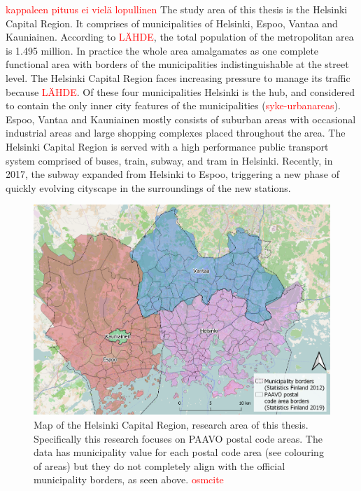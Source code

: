 \textcolor{red}{kappaleen pituus ei vielä lopullinen} The study area of this thesis is the Helsinki Capital Region. It comprises of municipalities of Helsinki, Espoo, Vantaa and Kauniainen. According to \textcolor{red}{LÄHDE}, the total population of the metropolitan area is 1.495 million. In practice the whole area amalgamates as one complete functional area with borders of the municipalities indistinguishable at the street level. The Helsinki Capital Region faces increasing pressure to manage its traffic because \textcolor{red}{LÄHDE}. Of these four municipalities Helsinki is the hub, and considered to contain the only inner city features of the municipalities (\textcolor{red}{syke-urbanareas}). Espoo, Vantaa and Kauniainen mostly consists of suburban areas with occasional industrial areas and large shopping complexes placed throughout the area. The Helsinki Capital Region is served with a high performance public transport system comprised of buses, train, subway, and tram in Helsinki. Recently, in 2017, the subway expanded from Helsinki to Espoo, triggering a new phase of quickly evolving cityscape in the surroundings of the new stations.

\begin{figure}[H]%
    \includegraphics[width=\textwidth]{images/thesis_resarea.png}
    \caption[Research area map]{Map of the Helsinki Capital Region, research area of this thesis. Specifically this research focuses on PAAVO postal code areas. The data has municipality value for each postal code area (see colouring of areas) but they do not completely align with the official municipality borders, as seen above. \textcolor{red}{osmcite}}%
    \label{fig:thesis_resarea}%
\end{figure}

